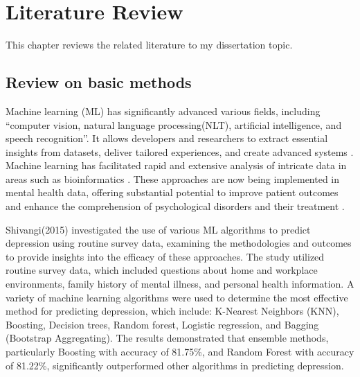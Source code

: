\def\baselinestretch{1}

\chapter{Literature Review}

\def\baselinestretch{1.44}


This chapter reviews the related literature to my dissertation topic. 
   
\smallskip

\goodbreak
\section{Review on basic methods}
Machine learning (ML) has significantly advanced various fields, including “computer vision, natural language processing(NLT), artificial intelligence, and speech recognition”. It allows developers and researchers to extract essential insights from datasets, deliver tailored experiences, and create advanced systems \citep{jordan2015machine}. Machine learning has facilitated rapid and extensive analysis of intricate data in areas such as bioinformatics \citep{luo2016big}. These approaches are now being implemented in mental health data, offering substantial potential to improve patient outcomes and enhance the comprehension of psychological disorders and their treatment \citep{shatte2019machine}.

\citet{jordan2015machine}Shivangi(2015) investigated the use of various ML algorithms to predict depression using routine survey data, examining the methodologies and outcomes to provide insights into the efficacy of these approaches. The study utilized routine survey data, which included questions about home and workplace environments, family history of mental illness, and personal health information. A variety of machine learning algorithms were used to determine the most effective method for predicting depression, which include: K-Nearest Neighbors (KNN), Boosting, Decision trees, Random forest, Logistic regression, and Bagging (Bootstrap Aggregating). The results demonstrated that ensemble methods, particularly Boosting with  accuracy of 81.75\%, and Random Forest with accuracy of 81.22\%, significantly outperformed other algorithms in predicting depression.

